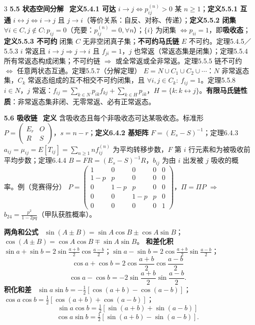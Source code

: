 \documentclass[UTF8,a4paper]{ctexart}
\newcommand{\Sec}[1]{\par\vspace{1.4pt}{\bfseries\color{blue!65!black}\small #1}\par\vspace{0.4pt}}
\newcommand{\T}[1]{{\bfseries #1}\ }
\newcommand{\B}[1]{\textbf{#1}}
\newcommand{\Hi}[1]{\textcolor{red!70!black}{#1}}
\begin{document}
\begin{multicols}{3}
\T{5.5 状态空间分解} \B{定义5.4.1 可达} $i\to j\iff p_{ij}^{(n)}>0$ 某 $n\ge1$；\B{定义5.5.1 互通} $i\leftrightarrow j\iff i\to j$ 且 $j\to i$（等价关系：自反、对称、传递）；\B{定义5.5.2 闭集} $\forall i\in C,j\notin C:p_{ij}=0$（充要：$p_{ij}^{(n)}=0,\forall n$）；$\{i\}$ 为闭集 $\iff p_{ii}=1$，即\B{吸收态}；\B{定义5.5.3 不可约} 闭集 $C$ 无非空闭真子集；\B{不可约马氏链} $E$ 不可约。\Hi{定理5.4.5／5.5.3} $i$ 常返且 $i\to j\Rightarrow j\to i$ 且 $f_{ji}=1$，$j$ 也常返（常返态集是闭集）；\Hi{定理5.5.4} 所有常返态构成闭集；不可约链 $\Rightarrow$ 或全常返或全非常返。\Hi{定理5.5.5} 链不可约 $\iff$ 任意两状态互通。\Hi{定理5.5.7（分解定理）} $E=N\cup C_1\cup C_2\cup\cdots$：$N$ 非常返态集，$C_k$ 常返态组成的互不相交不可约闭集，且 $\forall i,j\in C_k:\ f_{ij}=1$。\Hi{定理5.5.8} $i\in N$，$j$ 常返：$f_{ij}=\sum_{k\in N}p_{ik}f_{kj}+\sum_{k\in H}p_{ik}$，$H=\{k:k\leftrightarrow j\}$。\B{有限马氏链性质}：非常返态集非闭、无零常返、必有正常返态。

\T{5.6 吸收链} \B{定义} 含吸收态且每个非吸收态可达某吸收态。标准形 $P=\begin{pmatrix}E_r&O\\R&S\end{pmatrix}$，$s=n-r$；\B{定义6.4.2 基矩阵} $F=(E_s-S)^{-1}$；\Hi{定理6.4.3} $a_{ij}=\mu_{ij}=E[T_{ij}]=\sum_{n\ge1}n f_{ij}^{(n)}$ 为平均转移步数，$F$ 第 $i$ 行元素和为被吸收前平均步数；\Hi{定理6.4.4} $B=FR=(E_s-S)^{-1}R$，$b_{ij}$ 为由 $i$ 出发被 $j$ 吸收的概率。\Hi{例（竞赛得分）} $P=\begin{pmatrix}1&0&0&0&0\\1-p&p&0&0&0\\0&1-p&p&0&0\\0&0&1-p&p&0\\0&0&0&0&1\end{pmatrix}$，$\Pi=\Pi P$ $\Rightarrow$ $b_{24}=\frac{p^2}{1-2pq}$（甲队获胜概率）。

\Sec{三角公式速查}

\T{两角和公式} $\sin(A\pm B)=\sin A\cos B\pm\cos A\sin B$；$\cos(A\pm B)=\cos A\cos B\mp\sin A\sin B$。
\T{和差化积} $\sin a+\sin b=2\sin\frac{a+b}2\cos\frac{a-b}2$；$\sin a-\sin b=2\cos\frac{a+b}2\sin\frac{a-b}2$；
$$\cos a+\cos b=2\cos\frac{a+b}2\cos\frac{a-b}2$$$$\cos a-\cos b=-2\sin\frac{a+b}2\sin\frac{a-b}2.$$
\T{积化和差} $\sin a\sin b=-\frac12[\cos(a+b)-\cos(a-b)]$；$\cos a\cos b=\frac12[\cos(a+b)+\cos(a-b)]$；
$$\sin a\cos b=\tfrac12[\sin(a+b)+\sin(a-b)]$$$$\cos a\sin b=\tfrac12[\sin(a+b)-\sin(a-b)].$$

\Sec{必背清单与易错点}


\end{multicols}
\end{document}
